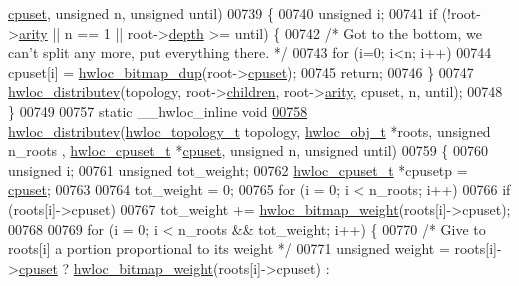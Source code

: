 \begin{DoxyCode}
      \hyperlink{a00016_a67925e0f2c47f50408fbdb9bddd0790f}{cpuset}, \textcolor{keywordtype}{unsigned} n, \textcolor{keywordtype}{unsigned} until)
00739 \{
00740   \textcolor{keywordtype}{unsigned} i;
00741   \textcolor{keywordflow}{if} (!root->\hyperlink{a00016_aac3f6da35c9b57599909a44ce2b716c1}{arity} || n == 1 || root->\hyperlink{a00016_a9d82690370275d42d652eccdea5d3ee5}{depth} >= until) \{
00742     \textcolor{comment}{/* Got to the bottom, we can't split any more, put everything there.  */}
00743     \textcolor{keywordflow}{for} (i=0; i<n; i++)
00744       cpuset[i] = \hyperlink{a00065_gaaa4ed76211cd3694dfbea2109fc440be}{hwloc_bitmap_dup}(root->\hyperlink{a00016_a67925e0f2c47f50408fbdb9bddd0790f}{cpuset});
00745     \textcolor{keywordflow}{return};
00746   \}
00747   \hyperlink{a00059_gaf057d7c5e3cb3df897ce527258537619}{hwloc_distributev}(topology, root->\hyperlink{a00016_a04d05403da37bfe17cd63b7c7dd07b1f}{children}, root->\hyperlink{a00016_aac3f6da35c9b57599909a44ce2b716c1}{arity}, cpuset, n, until);
00748 \}
00749 
00757 \textcolor{keyword}{static} \_\_hwloc\_inline \textcolor{keywordtype}{void}
\hypertarget{a00031_source_l00758}{}\hyperlink{a00059_gaf057d7c5e3cb3df897ce527258537619}{00758} \hyperlink{a00059_gaf057d7c5e3cb3df897ce527258537619}{hwloc_distributev}(\hyperlink{a00039_ga9d1e76ee15a7dee158b786c30b6a6e38}{hwloc_topology_t} topology, \hyperlink{a00016}{hwloc_obj_t} *roots, \textcolor{keywordtype}{unsigned} n\_roots
      , \hyperlink{a00040_ga4bbf39b68b6f568fb92739e7c0ea7801}{hwloc_cpuset_t} *\hyperlink{a00016_a67925e0f2c47f50408fbdb9bddd0790f}{cpuset}, \textcolor{keywordtype}{unsigned} n, \textcolor{keywordtype}{unsigned} until)
00759 \{
00760   \textcolor{keywordtype}{unsigned} i;
00761   \textcolor{keywordtype}{unsigned} tot\_weight;
00762   \hyperlink{a00040_ga4bbf39b68b6f568fb92739e7c0ea7801}{hwloc_cpuset_t} *cpusetp = \hyperlink{a00016_a67925e0f2c47f50408fbdb9bddd0790f}{cpuset};
00763 
00764   tot\_weight = 0;
00765   \textcolor{keywordflow}{for} (i = 0; i < n\_roots; i++)
00766     \textcolor{keywordflow}{if} (roots[i]->cpuset)
00767       tot\_weight += \hyperlink{a00065_ga12d520387be74f849f191d7a06ac325c}{hwloc_bitmap_weight}(roots[i]->cpuset);
00768 
00769   \textcolor{keywordflow}{for} (i = 0; i < n\_roots && tot\_weight; i++) \{
00770     \textcolor{comment}{/* Give to roots[i] a portion proportional to its weight */}
00771     \textcolor{keywordtype}{unsigned} weight = roots[i]->\hyperlink{a00016_a67925e0f2c47f50408fbdb9bddd0790f}{cpuset} ? \hyperlink{a00065_ga12d520387be74f849f191d7a06ac325c}{hwloc_bitmap_weight}(roots[i]->cpuset) : 

\end{DoxyCode}
